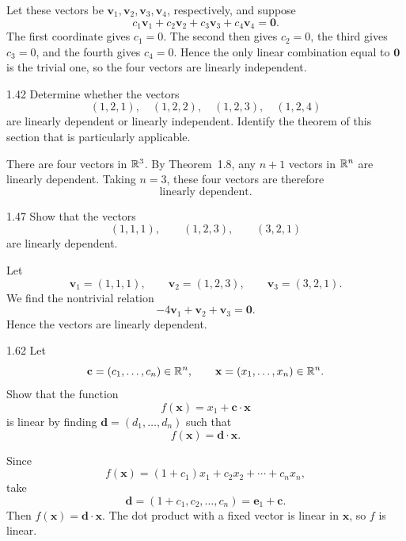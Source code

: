 \documentclass[11pt,oneside]{article}
\begin{document}
\begin{solution}
Let these vectors be $\mathbf v_1,\mathbf v_2,\mathbf v_3,\mathbf v_4$, respectively, and suppose
\[
    c_1\mathbf v_1+c_2\mathbf v_2+c_3\mathbf v_3+c_4\mathbf v_4=\mathbf 0.
\]
The first coordinate gives $c_1=0$. The second then gives $c_2=0$, the third gives $c_3=0$, and the fourth gives $c_4=0$. Hence the only linear combination equal to $\mathbf 0$ is the trivial one, so the four vectors are linearly independent.
\end{solution}

\begin{problem}{1.42}
Determine whether the vectors
\[
    (1,2,1),
    \quad
    (1,2,2),
    \quad
    (1,2,3),
    \quad
    (1,2,4)
\]
are linearly dependent or linearly independent. Identify the theorem of this section that is particularly applicable.
\end{problem}

\begin{solution}
There are four vectors in $\mathbb{R}^3$. By Theorem~1.8, any $n+1$ vectors in $\mathbb{R}^n$ are linearly dependent. Taking $n=3$, these four vectors are therefore
\[
    \boxed{\text{linearly dependent}}.
\]
\end{solution}

\begin{problem}{1.47}
Show that the vectors
\[
    (1,1,1),
    \qquad
    (1,2,3),
    \qquad
    (3,2,1)
\]
are linearly dependent.
\end{problem}

\begin{solution}
Let
\[
    \mathbf v_1=(1,1,1),
    \qquad
    \mathbf v_2=(1,2,3),
    \qquad
    \mathbf v_3=(3,2,1).
\]
We find the nontrivial relation
\[
    -4\mathbf v_1+\mathbf v_2+\mathbf v_3=\mathbf 0.
\]
Hence the vectors are linearly dependent.
\end{solution}

\begin{problem}{1.62}
Let
\[
    \mathbf c=(c_1,\dots,c_n)\in\mathbb{R}^n,
    \qquad
    \mathbf x=(x_1,\dots,x_n)\in\mathbb{R}^n.
\]
Show that the function
\[
    f(\mathbf x)=x_1+\mathbf c\cdot\mathbf x
\]
is linear by finding $\mathbf d=(d_1,\dots,d_n)$ such that
\[
    f(\mathbf x)=\mathbf d\cdot\mathbf x.
\]
\end{problem}

\begin{solution}
Since
\[
    f(\mathbf x)
    =(1+c_1)x_1+c_2x_2+\cdots+c_nx_n,
\]
take
\[
    \boxed{\mathbf d=(1+c_1,c_2,\dots,c_n)=\mathbf e_1+\mathbf c}.
\]
Then $f(\mathbf x)=\mathbf d\cdot\mathbf x$. The dot product with a fixed vector is linear in $\mathbf x$, so $f$ is linear.
\end{solution}
\end{document}
